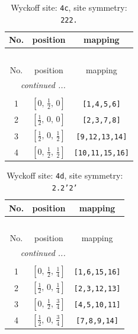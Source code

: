 \documentclass[fleqn,8pt]{jsarticle}
\begin{document}
\renewcommand{\arraystretch}{1.2}
\begin{longtable}{ccc}
\caption{Wyckoff site: {\tt 4c}, site symmetry: {\tt 222.}}
 \\
 \hline \hline
No. & position & mapping \\ \hline \endfirsthead

\multicolumn{2}{l}{\tablename\ \thetable{}} \\
 \hline \hline
No. & position & mapping \\ \hline \endhead

 \hline \hline
\multicolumn{2}{r}{\footnotesize\it continued ...} \\ \endfoot

 \hline \hline
\multicolumn{2}{r}{} \\ \endlastfoot

1 & $\left[ 0,\, \frac{1}{2},\, 0 \right]$ & {\tt [1,4,5,6]} \\ \hline
2 & $\left[ \frac{1}{2},\, 0,\, 0 \right]$ & {\tt [2,3,7,8]} \\ \hline
3 & $\left[ \frac{1}{2},\, 0,\, \frac{1}{2} \right]$ & {\tt [9,12,13,14]} \\ \hline
4 & $\left[ 0,\, \frac{1}{2},\, \frac{1}{2} \right]$ & {\tt [10,11,15,16]} \\
\end{longtable}
\renewcommand{\arraystretch}{1.2}
\begin{longtable}{ccc}
\caption{Wyckoff site: {\tt 4d}, site symmetry: {\tt 2.2'2'}}
 \\
 \hline \hline
No. & position & mapping \\ \hline \endfirsthead

\multicolumn{2}{l}{\tablename\ \thetable{}} \\
 \hline \hline
No. & position & mapping \\ \hline \endhead

 \hline \hline
\multicolumn{2}{r}{\footnotesize\it continued ...} \\ \endfoot

 \hline \hline
\multicolumn{2}{r}{} \\ \endlastfoot

1 & $\left[ 0,\, \frac{1}{2},\, \frac{1}{4} \right]$ & {\tt [1,6,15,16]} \\ \hline
2 & $\left[ \frac{1}{2},\, 0,\, \frac{1}{4} \right]$ & {\tt [2,3,12,13]} \\ \hline
3 & $\left[ 0,\, \frac{1}{2},\, \frac{3}{4} \right]$ & {\tt [4,5,10,11]} \\ \hline
4 & $\left[ \frac{1}{2},\, 0,\, \frac{3}{4} \right]$ & {\tt [7,8,9,14]} \\
\end{longtable}
\end{document}
